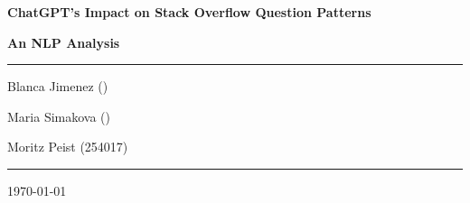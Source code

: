 \documentclass[12pt]{article}
\begin{document}
\begin{titlepage}
	\centering
	\par\vspace{0.75cm}
	{\huge\bfseries ChatGPT's Impact on Stack Overflow Question Patterns \par}
    {\Large\bfseries An NLP Analysis \par}
	\vspace{0.25cm}
    \noindent\rule{\textwidth}{1pt}
    {\Large Blanca Jimenez ()\par}
    {\Large Maria Simakova ()\par}
	{\Large Moritz Peist (254017)\par}
    \noindent\rule{\textwidth}{1pt}
    \tableofcontents
	\vfill

	{\large \today\par}
\end{titlepage}

\newpage




%

\printbibliography[heading=bibintoc,title={References}]
\end{document}
